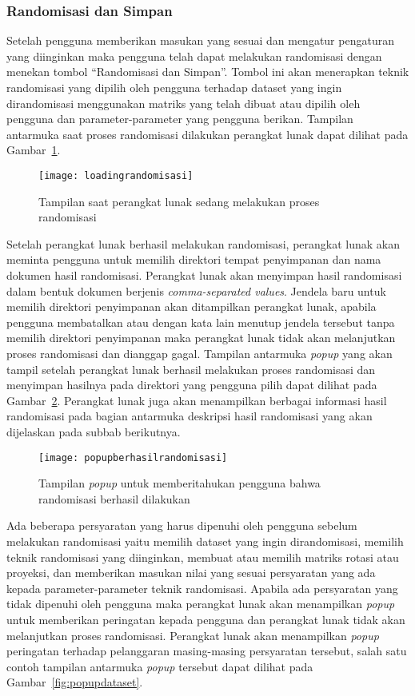 \subsubsection{Randomisasi dan Simpan}
\label{subsubsec:randomisasisimpan}

Setelah pengguna memberikan masukan yang sesuai dan mengatur pengaturan yang diinginkan maka pengguna telah dapat melakukan randomisasi dengan menekan tombol \textquotedblleft Randomisasi dan Simpan\textquotedblright. Tombol ini akan menerapkan teknik randomisasi yang dipilih oleh pengguna terhadap dataset yang ingin dirandomisasi menggunakan matriks yang telah dibuat atau dipilih oleh pengguna dan parameter-parameter yang pengguna berikan. Tampilan antarmuka saat proses randomisasi dilakukan perangkat lunak dapat dilihat pada Gambar~\ref{fig:loadingrandomisasi}.

\begin{figure}
	\centering
	\texttt{[image: loadingrandomisasi]}
	\caption{Tampilan saat perangkat lunak sedang melakukan proses randomisasi}
	\label{fig:loadingrandomisasi}
\end{figure}

Setelah perangkat lunak berhasil melakukan randomisasi, perangkat lunak akan meminta pengguna untuk memilih direktori tempat penyimpanan dan nama dokumen hasil randomisasi. Perangkat lunak akan menyimpan hasil randomisasi dalam bentuk dokumen berjenis \textit{comma-separated values}. Jendela baru untuk memilih direktori penyimpanan akan ditampilkan perangkat lunak, apabila pengguna membatalkan atau dengan kata lain menutup jendela tersebut tanpa memilih direktori penyimpanan maka perangkat lunak tidak akan melanjutkan proses randomisasi dan dianggap gagal. Tampilan antarmuka \textit{popup} yang akan tampil setelah perangkat lunak berhasil melakukan proses randomisasi dan menyimpan hasilnya pada direktori yang pengguna pilih dapat dilihat pada Gambar~\ref{fig:popupberhasilrandomisasi}. Perangkat lunak juga akan menampilkan berbagai informasi hasil randomisasi pada bagian antarmuka deskripsi hasil randomisasi yang akan dijelaskan pada subbab berikutnya.

\begin{figure}
	\centering
	\texttt{[image: popupberhasilrandomisasi]}
	\caption{Tampilan \textit{popup} untuk memberitahukan pengguna bahwa randomisasi berhasil dilakukan}
	\label{fig:popupberhasilrandomisasi}
\end{figure}

Ada beberapa persyaratan yang harus dipenuhi oleh pengguna sebelum melakukan randomisasi yaitu memilih dataset yang ingin dirandomisasi, memilih teknik randomisasi yang diinginkan, membuat atau memilih matriks rotasi atau proyeksi, dan memberikan masukan nilai yang sesuai persyaratan yang ada kepada parameter-parameter teknik randomisasi. Apabila ada persyaratan yang tidak dipenuhi oleh pengguna maka perangkat lunak akan menampilkan \textit{popup} untuk memberikan peringatan kepada pengguna dan perangkat lunak tidak akan melanjutkan proses randomisasi. Perangkat lunak akan menampilkan \textit{popup} peringatan terhadap pelanggaran masing-masing persyaratan tersebut, salah satu contoh tampilan antarmuka \textit{popup} tersebut dapat dilihat pada Gambar~\ref{fig:popupdataset}.


